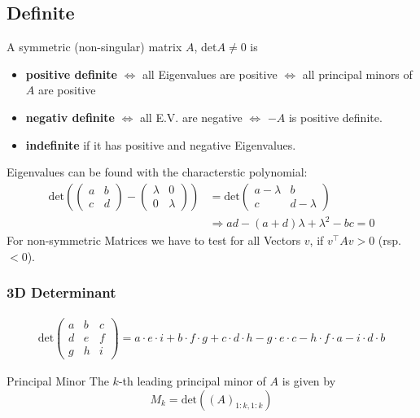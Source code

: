 \documentclass[a4paper,fontsize = 10pt]{article}
\begin{document}
\subsection{Definite}
A symmetric (non-singular) matrix $A$, det$A \ne 0$ is
\begin{itemize}
  \item \textbf{positive definite} $\iff$ all Eigenvalues are positive $\iff$ all principal minors of $A$ are positive
  \item \textbf{negativ definite} $\iff$ all E.V. are negative $\iff$ $-A$ is positive definite.
  \item \textbf{indefinite} if it has positive and negative Eigenvalues.
\end{itemize}
Eigenvalues can be found with the characterstic polynomial:
\begin{align*}
  \text{det} \left(
  \begin{pmatrix}
    a & b\\
    c & d
  \end{pmatrix}
  -
  \begin{pmatrix}
    \lambda & 0\\
    0 & \lambda
  \end{pmatrix}
  \right)
  &=
  \text{det}
  \begin{pmatrix}
    a - \lambda & b\\
    c & d - \lambda
  \end{pmatrix}\\
  &\Rightarrow ad - (a + d) \lambda + \lambda^2 - bc = 0
\end{align*}
For non-symmetric Matrices we have to test for all Vectors \(v\), if \(v^\top A v > 0\) (rsp. \(< 0\)).
\subsubsection*{3D Determinant}
\begin{align*}
  \text{det}
  \begin{pmatrix}
    a&b&c\\
    d&e&f\\
    g&h&i
  \end{pmatrix}
  = 
  a \cdot e \cdot i + b \cdot f \cdot g + c \cdot d \cdot h - g \cdot e \cdot c - h \cdot f \cdot a - i \cdot d \cdot b
\end{align*}

\begin{subbox}{Principal Minor}
    The $k$-th leading principal minor of $A$ is given by 
    \[M_k = \text{det}\left((A)_{1:k,1:k}\right)\]
\end{subbox}
\end{document}
